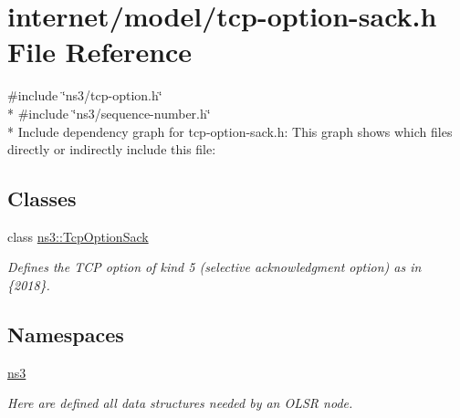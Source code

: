 \hypertarget{tcp-option-sack_8h}{}\section{internet/model/tcp-\/option-\/sack.h File Reference}
\label{tcp-option-sack_8h}
{\ttfamily \#include \char`\"{}ns3/tcp-\/option.\+h\char`\"{}}\\*
{\ttfamily \#include \char`\"{}ns3/sequence-\/number.\+h\char`\"{}}\\*
Include dependency graph for tcp-\/option-\/sack.h\+:
This graph shows which files directly or indirectly include this file\+:
\subsection*{Classes}
\begin{DoxyCompactItemize}
\item 
class \hyperlink{classns3_1_1TcpOptionSack}{ns3\+::\+Tcp\+Option\+Sack}
\begin{DoxyCompactList}\small\item\em Defines the T\+CP option of kind 5 (selective acknowledgment option) as in \{2018\}. \end{DoxyCompactList}\end{DoxyCompactItemize}
\subsection*{Namespaces}
\begin{DoxyCompactItemize}
\item 
 \hyperlink{namespacens3}{ns3}
\begin{DoxyCompactList}\small\item\em Here are defined all data structures needed by an O\+L\+SR node. \end{DoxyCompactList}\end{DoxyCompactItemize}
